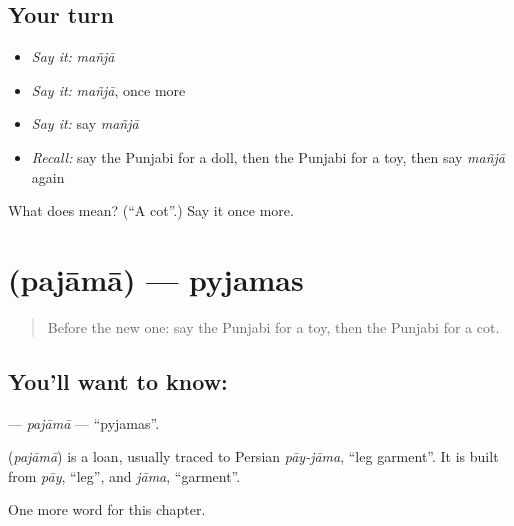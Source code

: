 \subsection*{Your turn}
\begin{itemize}
\raggedright
  \item \emph{Say it:} \emph{mañjā}
  \item \emph{Say it:} \emph{mañjā}, once more
  \item \emph{Say it:} say \emph{mañjā}
  \item \emph{Recall:} say the Punjabi for a doll, then the Punjabi for a toy, then say \emph{mañjā} again
\end{itemize}

\begin{tcolorbox}[breakable,colback=teal!4,colframe=teal!35!black,title={Before you move on}]
What does  mean? (\textquotedblleft{}A cot\textquotedblright{}.) Say it once more.
\end{tcolorbox}
\section[\texorpdfstring{\pa{ਪਜਾਮਾ} (pajāmā)}{ਪਜਾਮਾ (pajāmā)}]{ (pajāmā) — pyjamas}

\label{lesson:PA-C119-pajama}



\begin{quote}
Before the new one: say the Punjabi for a toy, then the Punjabi for a cot.
\end{quote}

\subsection*{You'll want to know: }
\textbf{} — \emph{pajāmā} — \textquotedblleft{}pyjamas\textquotedblright{}.

\begin{cousinweb}
\textbf{} (\emph{pajāmā}) is a loan, usually traced to Persian \emph{pāy-jāma}, \textquotedblleft{}leg garment\textquotedblright{}. It is built from \emph{pāy}, \textquotedblleft{}leg\textquotedblright{}, and \emph{jāma}, \textquotedblleft{}garment\textquotedblright{}.
\end{cousinweb}

\begin{grammarlens}[title={What you've built}]
One more word for this chapter.
\end{grammarlens}


